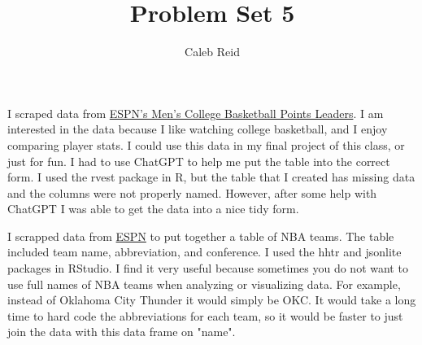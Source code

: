 \documentclass{article}
\title{Problem Set 5}
\author{Caleb Reid}
\begin{document}
    
\maketitle

I scraped data from  \href{https://www.espn.com/mens-college-basketball/stats/player}{ESPN's Men's College Basketball Points Leaders}. I am interested in the data because I like watching college basketball, and I enjoy comparing player stats. I could use this data in my final project of this class, or just for fun. I had to use ChatGPT to help me put the table into the correct form. I used the rvest package in R, but the table that I created has missing data and the columns were not properly named. However, after some help with ChatGPT I was able to get the data into a nice tidy form.  

I scrapped data from \href{https://www.espn.com/mens-college-basketball/stats/player}{ESPN} to put together a table of NBA teams. The table included team name, abbreviation, and conference. I used the hhtr and jsonlite packages in RStudio. I find it very useful because sometimes you do not want to use full names of NBA teams when analyzing or visualizing data. For example, instead of Oklahoma City Thunder it would simply be OKC. It would take a long time to hard code the abbreviations for each team, so it would be faster to just join the data with this data frame on "name".
\end{document}
